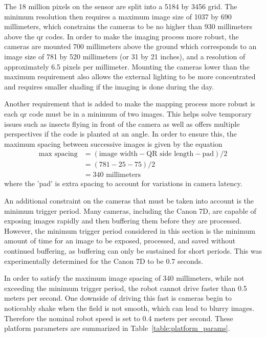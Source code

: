 The 18 million pixels on the sensor are split into a 5184 by 3456 grid.  The minimum resolution then requires a maximum image size of 1037 by 690 millimeters, which constrains the cameras to be no higher than 930 millimeters above the \ac{qr} codes.  In order to make the imaging process more robust, the cameras are mounted 700 millimeters above the ground which corresponds to an image size of 781 by 520 millimeters (or 31 by 21 inches), and a resolution of approximately 6.5 pixels per millimeter.  Mounting the cameras lower than the maximum requirement also allows the external lighting to be more concentrated and requires smaller shading if the imaging is done during the day.  

Another requirement that is added to make the mapping process more robust is each \ac{qr} code must be in a minimum of two images.  This helps solve temporary issues such as insects flying in front of the camera as well as offers multiple perspectives if the code is planted at an angle.  In order to ensure this, the maximum spacing between successive images is given by the equation
\begin{align*}
 \text{max spacing} &= (\text{image width} - \text{QR side length} - \text{pad}) / 2 \\
             &= (781 - 25 - 75) / 2 \\ 
             &= 340 \text{ millimeters}
\end{align*}
where the 'pad' is extra spacing to account for variations in camera latency.
  
An additional constraint on the cameras that must be taken into account is the minimum trigger period.  Many cameras, including the Canon 7D, are capable of exposing images rapidly and then buffering them before they are processed.  However, the minimum trigger period considered in this section is the minimum amount of time for an image to be exposed, processed, and saved without continued buffering, as buffering can only be sustained for short periods.  This was experimentally determined for the Canon 7D to be 0.7 seconds.  

In order to satisfy the maximum image spacing of 340 millimeters, while not exceeding the minimum trigger period, the robot cannot drive faster than 0.5 meters per second.  One downside of driving this fast is cameras begin to noticeably shake when the field is not smooth, which can lead to blurry images.  Therefore the nominal robot speed is set to 0.4 meters per second.  These platform parameters are summarized in Table~\ref{table:platform_params}.

